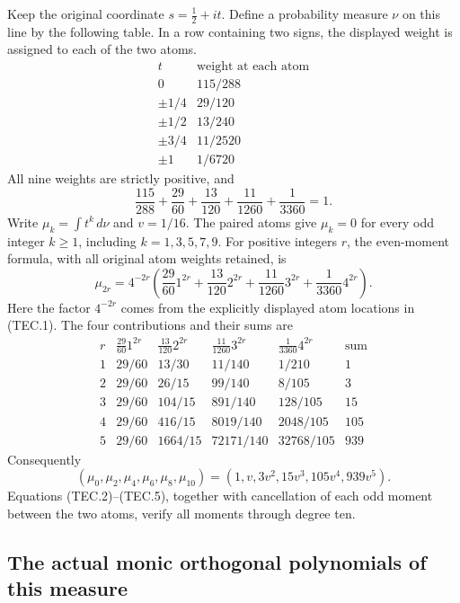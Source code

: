 Keep the original coordinate \(s=\tfrac12+it\).  Define a probability
measure \(\nu\) on this line by the following table.  In a row containing
two signs, the displayed weight is assigned to each of the two atoms.
\[
\begin{array}{c|c}
t&\text{weight at each atom}\\\hline
0&115/288\\
\pm1/4&29/120\\
\pm1/2&13/240\\
\pm3/4&11/2520\\
\pm1&1/6720
\end{array}                                                    \tag{TEC.1}
\]
All nine weights are strictly positive, and
\[
 \frac{115}{288}+\frac{29}{60}+\frac{13}{120}
       +\frac{11}{1260}+\frac1{3360}=1.                          \tag{TEC.2}
\]
Write \(\mu_k=\int t^k\,d\nu\) and \(v=1/16\).
The paired atoms give \(\mu_k=0\) for every odd integer \(k\geq1\),
including \(k=1,3,5,7,9\).  For positive integers \(r\), the
even-moment formula, with all original atom weights retained, is
\[
 \mu_{2r}=4^{-2r}
 \left(\frac{29}{60}1^{2r}+\frac{13}{120}2^{2r}
             +\frac{11}{1260}3^{2r}+\frac1{3360}4^{2r}\right).
                                                                    \tag{TEC.3}
\]
Here the factor \(4^{-2r}\) comes from the explicitly displayed atom
locations in (TEC.1).  The four contributions and their sums are
\[
\begin{array}{c|rrrr|r}
r&\frac{29}{60}1^{2r}&\frac{13}{120}2^{2r}
 &\frac{11}{1260}3^{2r}&\frac1{3360}4^{2r}&\text{sum}\\\hline
1&29/60&13/30&11/140&1/210&1\\
2&29/60&26/15&99/140&8/105&3\\
3&29/60&104/15&891/140&128/105&15\\
4&29/60&416/15&8019/140&2048/105&105\\
5&29/60&1664/15&72171/140&32768/105&939
\end{array}                                                       \tag{TEC.4}
\]
Consequently
\[
 (\mu_0,\mu_2,\mu_4,\mu_6,\mu_8,\mu_{10})
       =(1,v,3v^2,15v^3,105v^4,939v^5).                           \tag{TEC.5}
\]
Equations (TEC.2)--(TEC.5), together with cancellation of each odd
moment between the two atoms, verify all moments through degree ten.

\subsection{The actual monic orthogonal polynomials of this measure}

